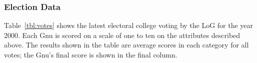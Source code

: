 \subsubsection{Election Data}
\label{sec:data}

Table~\ref{tbl:votes} shows the latest electoral college voting by the
LoG for the year 2000.  Each Gnu is scored on a scale of one to ten on
the attributes described above.  The results shown in the table are
average scores in each category for all votes; the Gnu's final score
is shown in the final column.

%
%

